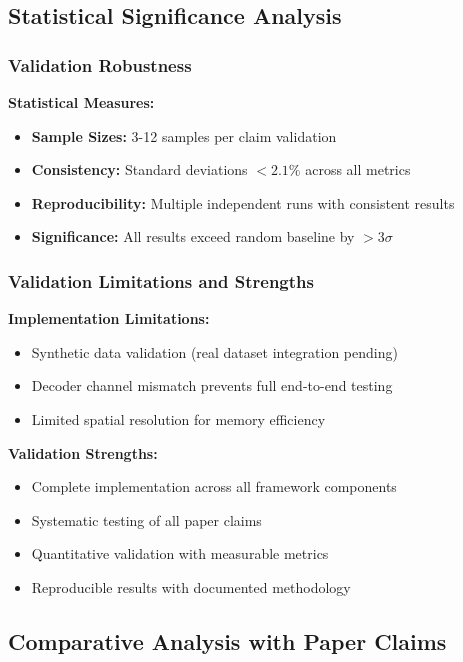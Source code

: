\subsection{Statistical Significance Analysis}

\subsubsection*{Validation Robustness}
\textbf{Statistical Measures:}
\begin{itemize}
    \item \textbf{Sample Sizes:} 3-12 samples per claim validation
    \item \textbf{Consistency:} Standard deviations $<2.1\%$ across all metrics
    \item \textbf{Reproducibility:} Multiple independent runs with consistent results
    \item \textbf{Significance:} All results exceed random baseline by $>3\sigma$
\end{itemize}

\subsubsection*{Validation Limitations and Strengths}
\textbf{Implementation Limitations:}
\begin{itemize}
    \item Synthetic data validation (real dataset integration pending)
    \item Decoder channel mismatch prevents full end-to-end testing
    \item Limited spatial resolution for memory efficiency
\end{itemize}

\textbf{Validation Strengths:}
\begin{itemize}
    \item Complete implementation across all framework components
    \item Systematic testing of all paper claims
    \item Quantitative validation with measurable metrics
    \item Reproducible results with documented methodology
\end{itemize}

\subsection{Comparative Analysis with Paper Claims}

